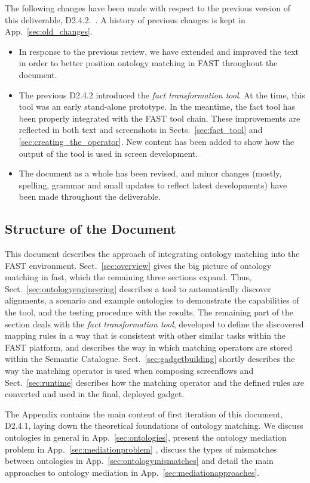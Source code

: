 \documentclass{fast_latex}
\begin{document}
The following changes have been made with respect to the previous version of this deliverable, D2.4.2.~\cite{ambrus2010mediation}. A history of previous changes is kept in App.~\ref{sec:old_changes}.

\begin{itemize}
	\item In response to the previous review, we have extended and improved the text in order to better position ontology matching in FAST throughout the document.
	\item The previous D2.4.2 introduced the \emph{fact transformation tool}. At the time, this tool was an early stand-alone prototype. In the meantime, the fact tool has been properly integrated with the FAST tool chain. These improvements are reflected in both text and screenshots in Sects.~\ref{sec:fact_tool} and \ref{sec:creating_the_operator}. New content has been added to show how the output of the tool is used in screen development.
	\item The document as a whole has been revised, and minor changes (mostly, spelling, grammar and small updates to reflect latest developments) have been made throughout the deliverable.
\end{itemize}


\subsection{Structure of the Document}
This document describes the approach of integrating ontology matching into the FAST environment. Sect.~\ref{sec:overview} gives the big picture of ontology matching in fast, which the remaining three sections expand. Thus, Sect.~\ref{sec:ontologyengineering} describes a tool to automatically discover alignments, a scenario and example ontologies to demonstrate the capabilities of the tool, and the testing procedure with the results. The remaining part of the section deals with the \emph{fact transformation tool}, developed to define the discovered mapping rules in a way that is consistent with other similar tasks within the FAST platform, and describes the way in which matching operators are stored within the Semantic Catalogue. Sect.~\ref{sec:gadgetbuilding} shortly describes the way the matching operator is used when composing screenflows and Sect.~\ref{sec:runtime} describes how the matching operator and the defined rules are converted and used in the final, deployed gadget.

The Appendix contains the main content of first iteration of this document, D2.4.1, laying down the theoretical foundations of ontology matching. We discuss ontologies in general in App.~\ref{sec:ontologies}, present the ontology mediation problem in App.~\ref{sec:mediationproblem} , discuss the types  of mismatches between ontologies in App.~\ref{sec:ontologymismatches} and detail the main approaches to ontology mediation in App.~\ref{sec:mediationapproaches}.
\end{document}
